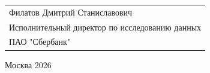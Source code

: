 \begin{titlepage}
{
\begin{tabular}{l}
Филатов Дмитрий Станиславович\\
Исполнительный директор по исследованию данных\\
ПАО "Сбербанк" 
\end{tabular}}





\vspace{\fill}

\begin{center}
Москва 2026
\end{center}

\end{titlepage}